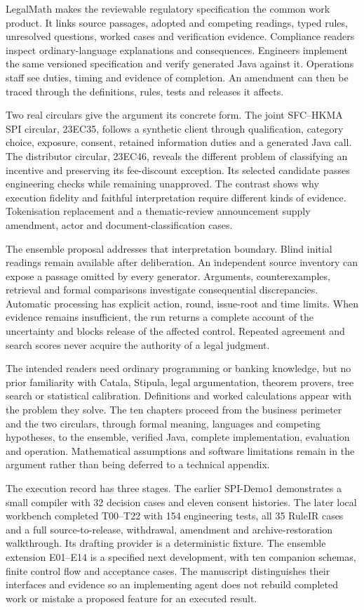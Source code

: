 \documentclass[12pt,a4paper,oneside,openany]{book}
\begin{document}
LegalMath makes the reviewable regulatory specification the common work product.
It links source passages, adopted and competing readings, typed rules, unresolved
questions, worked cases and verification evidence. Compliance readers inspect
ordinary-language explanations and consequences. Engineers implement the same
versioned specification and verify generated Java against it. Operations staff
see duties, timing and evidence of completion. An amendment can then be traced
through the definitions, rules, tests and releases it affects.

Two real circulars give the argument its concrete form. The joint SFC--HKMA SPI
circular, 23EC35, follows a synthetic client through qualification, category
choice, exposure, consent, retained information duties and a generated Java
call. The distributor circular, 23EC46, reveals the different problem of
classifying an incentive and preserving its fee-discount exception. Its selected
candidate passes engineering checks while remaining unapproved. The contrast
shows why execution fidelity and faithful interpretation require different
kinds of evidence. Tokenisation replacement and a thematic-review announcement
supply amendment, actor and document-classification cases.

The ensemble proposal addresses that interpretation boundary. Blind initial
readings remain available after deliberation. An independent source inventory
can expose a passage omitted by every generator. Arguments, counterexamples,
retrieval and formal comparisons investigate consequential discrepancies.
Automatic processing has explicit action, round, issue-root and time limits.
When evidence remains insufficient, the run returns a complete account of the
uncertainty and blocks release of the affected control. Repeated agreement and
search scores never acquire the authority of a legal judgment.

The intended readers need ordinary programming or banking knowledge, but no
prior familiarity with Catala, Stipula, legal argumentation, theorem provers,
tree search or statistical calibration. Definitions and worked calculations
appear with the problem they solve. The ten chapters proceed from the business
perimeter and the two circulars, through formal meaning, languages and competing
hypotheses, to the ensemble, verified Java, complete implementation, evaluation
and operation. Mathematical assumptions and software limitations remain in the
argument rather than being deferred to a technical appendix.

The execution record has three stages. The earlier SPI-Demo1 demonstrates a
small compiler with 32 decision cases and eleven consent histories. The later
local workbench completed T00--T22 with 154 engineering tests, all 35 RuleIR
cases and a full source-to-release, withdrawal, amendment and archive-restoration
walkthrough. Its drafting provider is a deterministic fixture. The ensemble
extension E01--E14 is a specified next development, with ten companion schemas,
finite control flow and acceptance cases. The manuscript distinguishes their
interfaces and evidence so an implementing agent does not rebuild completed
work or mistake a proposed feature for an executed result.
\end{document}
